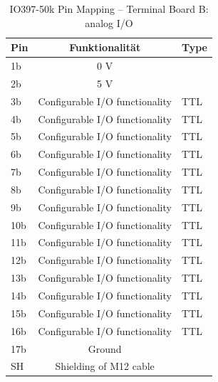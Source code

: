 \begin{table}[ht]
	\centering
	\caption{IO397-50k Pin Mapping – Terminal Board B: analog I/O \cite{speedgoat:IO397}}
	\label{speedgoat:IO397B}
	\begin{tabular}{lcl}
		\hline
		\textbf{Pin}             & \textbf{Funktionalität}        & \textbf{Type} \\ \hline
		\multicolumn{1}{l|}{1b}  & 0 V                            &               \\
		\multicolumn{1}{l|}{2b}  & 5 V                            &               \\\hline
		\multicolumn{1}{l|}{3b}  & Configurable I/O functionality & TTL           \\
		\multicolumn{1}{l|}{4b}  & Configurable I/O functionality & TTL           \\
		\multicolumn{1}{l|}{5b}  & Configurable I/O functionality & TTL           \\
		\multicolumn{1}{l|}{6b}  & Configurable I/O functionality & TTL           \\
		\multicolumn{1}{l|}{7b}  & Configurable I/O functionality & TTL           \\
		\multicolumn{1}{l|}{8b}  & Configurable I/O functionality & TTL           \\
		\multicolumn{1}{l|}{9b}  & Configurable I/O functionality & TTL           \\
		\multicolumn{1}{l|}{10b} & Configurable I/O functionality & TTL           \\
		\multicolumn{1}{l|}{11b} & Configurable I/O functionality & TTL           \\
		\multicolumn{1}{l|}{12b} & Configurable I/O functionality & TTL           \\
		\multicolumn{1}{l|}{13b} & Configurable I/O functionality & TTL           \\
		\multicolumn{1}{l|}{14b} & Configurable I/O functionality & TTL           \\
		\multicolumn{1}{l|}{15b} & Configurable I/O functionality & TTL           \\
		\multicolumn{1}{l|}{16b} & Configurable I/O functionality & TTL           \\\hline
		\multicolumn{1}{l|}{17b} & Ground                         &               \\
		\multicolumn{1}{l|}{SH}  & Shielding of M12 cable         &               \\ \hline
	\end{tabular}
\end{table}



